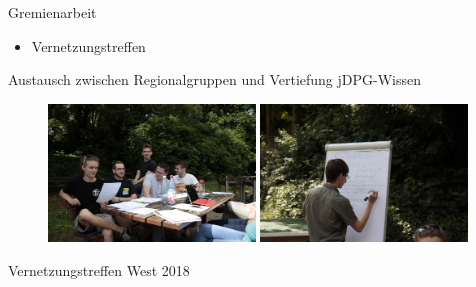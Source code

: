 \documentclass[
]{beamer}
\begin{document}
\begin{frame}{Gremienarbeit}
  \vfill
  
   \begin{minipage}{0.4\textwidth}
     \begin{itemize}
       \item Vernetzungstreffen
     \end{itemize}
     \begin{center}
      Austausch zwischen Regionalgruppen und Vertiefung jDPG-Wissen
     \end{center}
   \end{minipage}%
   \hfill
   \begin{minipage}{0.58\textwidth}
     \begin{figure}
       \centering
       \includegraphics[width=0.49\textwidth]{figure/VT-West-2018_Austausch}\hfill
       \includegraphics[width=0.49\textwidth]{figure/VT-West-2018_wissen}
      \end{figure}
      \begin{center}
       Vernetzungstreffen West 2018
     \end{center}
   \end{minipage}
\end{frame}
\end{document}
